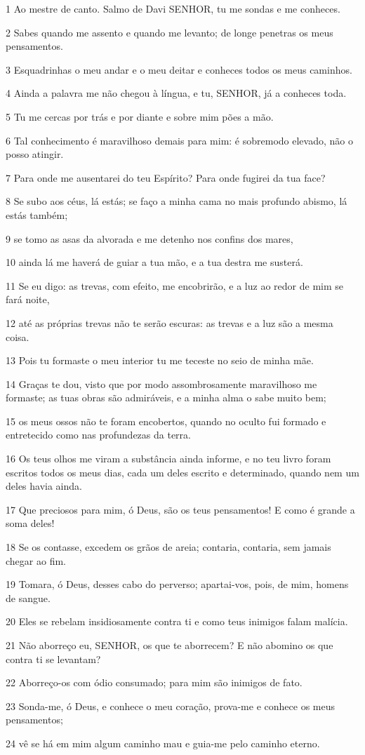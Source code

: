 \par 1 Ao mestre de canto. Salmo de Davi SENHOR, tu me sondas e me conheces.
\par 2 Sabes quando me assento e quando me levanto; de longe penetras os meus pensamentos.
\par 3 Esquadrinhas o meu andar e o meu deitar e conheces todos os meus caminhos.
\par 4 Ainda a palavra me não chegou à língua, e tu, SENHOR, já a conheces toda.
\par 5 Tu me cercas por trás e por diante e sobre mim pões a mão.
\par 6 Tal conhecimento é maravilhoso demais para mim: é sobremodo elevado, não o posso atingir.
\par 7 Para onde me ausentarei do teu Espírito? Para onde fugirei da tua face?
\par 8 Se subo aos céus, lá estás; se faço a minha cama no mais profundo abismo, lá estás também;
\par 9 se tomo as asas da alvorada e me detenho nos confins dos mares,
\par 10 ainda lá me haverá de guiar a tua mão, e a tua destra me susterá.
\par 11 Se eu digo: as trevas, com efeito, me encobrirão, e a luz ao redor de mim se fará noite,
\par 12 até as próprias trevas não te serão escuras: as trevas e a luz são a mesma coisa.
\par 13 Pois tu formaste o meu interior tu me teceste no seio de minha mãe.
\par 14 Graças te dou, visto que por modo assombrosamente maravilhoso me formaste; as tuas obras são admiráveis, e a minha alma o sabe muito bem;
\par 15 os meus ossos não te foram encobertos, quando no oculto fui formado e entretecido como nas profundezas da terra.
\par 16 Os teus olhos me viram a substância ainda informe, e no teu livro foram escritos todos os meus dias, cada um deles escrito e determinado, quando nem um deles havia ainda.
\par 17 Que preciosos para mim, ó Deus, são os teus pensamentos! E como é grande a soma deles!
\par 18 Se os contasse, excedem os grãos de areia; contaria, contaria, sem jamais chegar ao fim.
\par 19 Tomara, ó Deus, desses cabo do perverso; apartai-vos, pois, de mim, homens de sangue.
\par 20 Eles se rebelam insidiosamente contra ti e como teus inimigos falam malícia.
\par 21 Não aborreço eu, SENHOR, os que te aborrecem? E não abomino os que contra ti se levantam?
\par 22 Aborreço-os com ódio consumado; para mim são inimigos de fato.
\par 23 Sonda-me, ó Deus, e conhece o meu coração, prova-me e conhece os meus pensamentos;
\par 24 vê se há em mim algum caminho mau e guia-me pelo caminho eterno.

